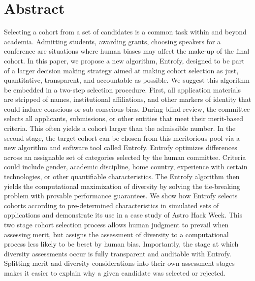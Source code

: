 \documentclass[10pt,letterpaper]{article}
\begin{document}
\section*{Abstract}
Selecting a cohort from a set of candidates is a common task within and beyond academia. Admitting students, awarding grants, choosing speakers for a conference are situations where human biases may affect the make-up of the final cohort. In this paper, we propose a new algorithm, Entrofy, designed to be part of a larger decision making strategy aimed at making cohort selection as just, quantitative, transparent, and accountable as possible.
We suggest this algorithm be embedded in a two-step selection procedure. First, all application materials are stripped of names, institutional affiliations, and other markers of identity that could induce conscious or sub-conscious bias. During blind review, the committee selects all applicants, submissions, or other entities that meet their merit-based criteria. This often yields a cohort larger than the admissible number.
In the second stage, the target cohort can be chosen from this meritorious pool via a new algorithm and software tool called Entrofy. Entrofy optimizes differences across an assignable set of categories selected by the human committee. Criteria could include gender, academic discipline, home country, experience with certain technologies, or other quantifiable characteristics. The Entrofy algorithm then yields the computational maximization of diversity by solving the tie-breaking problem with provable performance guarantees. We show how Entrofy selects cohorts according to pre-determined characteristics in simulated sets of applications and demonstrate its use in a case study of Astro Hack Week. 
This two stage cohort selection process allows human judgment to prevail when assessing merit, but assigns the assessment of diversity to a computational process less likely to be beset by human bias. Importantly, the stage at which diversity assessments occur is fully transparent and auditable with Entrofy. Splitting merit and diversity considerations into their own assessment stages makes it easier to explain why a given candidate was selected or rejected. 


\end{document}
